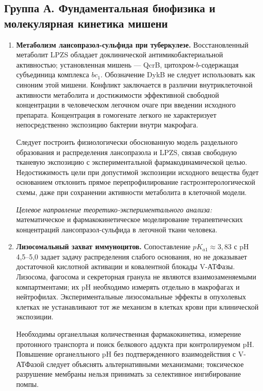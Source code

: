 \documentclass[11pt,a4paper,notitlepage]{report}
\newcommand{\src}[1]{\unskip\space\cite{#1}}
\begin{document}
\subsection{Группа А. Фундаментальная биофизика и молекулярная кинетика мишени}
\begin{enumerate}[label=\textbf{\arabic*.},leftmargin=*,itemsep=0.9\baselineskip]

\item \textbf{Метаболизм лансопразол-сульфида при туберкулезе.} Восстановленный метаболит LPZS обладает доклинической антимикобактериальной активностью; установленная мишень --- QcrB, цитохром-$b$-содержащая субъединица комплекса $bc_1$. Обозначение DykB не следует использовать как синоним этой мишени. Конфликт заключается в различии внутриклеточной активности метаболита и достижимости эффективной свободной концентрации в человеческом легочном очаге при введении исходного препарата. Концентрация в гомогенате легкого не характеризует непосредственно экспозицию бактерии внутри макрофага.\src{moltb,moltbstructure}

Следует построить физиологически обоснованную модель раздельного образования и распределения лансопразола и LPZS, связав свободную тканевую экспозицию с экспериментальной фармакодинамической целью. Недостижимость цели при допустимой экспозиции исходного вещества будет основанием отклонить прямое перепрофилирование гастроэнтерологической схемы, даже при сохранении активности метаболита в клеточной модели.

\textit{Целевое направление теоретико-экспериментального анализа:} математическое и фармакокинетическое моделирование терапевтических концентраций лансопразол-сульфида в легочной ткани человека.

\item \textbf{Лизосомальный захват иммуноцитов.} Сопоставление $pK_{a1}\approx3{,}83$ с pH 4,5--5,0 задает задачу распределения слабого основания, но не доказывает достаточной кислотной активации и ковалентной блокады V-АТФазы. Лизосома, фагосома и секреторная гранула не являются взаимозаменяемыми компартментами; их pH необходимо измерять отдельно в макрофагах и нейтрофилах. Экспериментальные лизосомальные эффекты в опухолевых клетках не устанавливают тот же механизм в клетках крови при клинической экспозиции.\src{molchem,mollysosome}

Необходимы органелльная количественная фармакокинетика, измерение протонного транспорта и поиск белкового аддукта при контролируемом pH. Повышение органелльного pH без подтвержденного взаимодействия с V-АТФазой следует объяснять альтернативными механизмами; токсическое разрушение мембраны нельзя принимать за селективное ингибирование помпы.


\end{enumerate}
\end{document}
